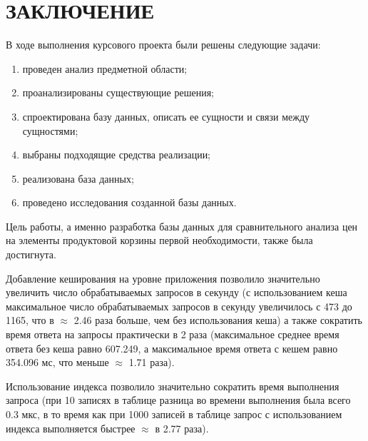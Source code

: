 \chapter*{ЗАКЛЮЧЕНИЕ}

В ходе выполнения курсового проекта были решены следующие задачи: 

\begin{enumerate}[label={\arabic*)}]
	\item проведен анализ предметной области;
	\item проанализированы существующие решения;
	\item спроектирована базу данных, описать ее сущности и связи между сущностями;
	\item выбраны подходящие средства реализации;
	\item реализована база данных;
	\item проведено исследования созданной базы данных.
\end{enumerate}

Цель работы, а именно разработка базы данных для сравнительного анализа цен на элементы продуктовой корзины первой необходимости, также была достигнута.

Добавление кеширования на уровне приложения позволило значительно увеличить число обрабатываемых запросов в секунду (с использованием кеша максимальное число обрабатываемых запросов в секунду увеличилось с 473 до 1165, что в $\approx$ 2.46 раза больше, чем без использования кеша) а также сократить время ответа на запросы практически в 2 раза (максимальное среднее время ответа без кеша равно 607.249, а максимальное время ответа с кешем равно 354.096 мс, что меньше $\approx$ 1.71 раза).

Использование индекса позволило значительно сократить время выполнения запроса (при 10 записях в таблице разница во времени выполнения была всего 0.3 мкс, в то время как при 1000 записей в таблице запрос с использованием индекса выполняется быстрее $\approx$ в 2.77 раза).